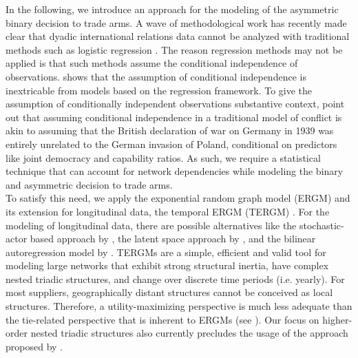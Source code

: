\documentclass[12pt, letterpaper]{article}
\numberwithin{equation}{section}
\begin{document}
In the following, we introduce an approach for the modeling of the asymmetric binary decision to trade arms. 
A wave of methodological work has recently made clear that dyadic international relations data cannot be analyzed with traditional methods such as logistic regression \citep{Ward:2007, WaAhAr:13, art:Thurner2009, art:Cranmer2011}. 
The reason regression methods may not be applied is that such methods assume the conditional independence of observations. 
\cite{art:Cranmer2011} shows that the assumption of conditional independence is inextricable from models based on the regression framework. 
To give the assumption of conditionally independent observations substantive context, \cite{Cranmer2012a} point out that assuming conditional independence in a traditional model of conflict is akin to assuming that the British declaration of war on Germany in 1939 was entirely unrelated to the German invasion of Poland, conditional on predictors like joint democracy and capability ratios. 
As such, we require a statistical technique that can account for network dependencies while modeling the binary and asymmetric decision to trade arms. \\
\indent To satisfy this need, we apply the exponential random graph model (ERGM) and its extension for longitudinal data, the temporal ERGM (TERGM) \citep{HaFuXi:10}. For the modeling of longitudinal data, there are possible alternatives like the stochastic-actor based approach by \cite{Snijders:17}, the latent space approach by \cite{Hoff_etal.2002}, and the bilinear autoregression model by \cite{Minhas_etal.2016}. TERGMs are a simple, efficient and valid tool for modeling large networks that exhibit strong structural inertia, have complex nested triadic structures, and change over discrete time periods (i.e. yearly). For most suppliers, geographically distant structures cannot be conceived as local structures. Therefore, a utility-maximizing perspective is much less adequate than the tie-related perspective that is inherent to ERGMs (see \cite{Block-etal.16}). Our focus on higher-order nested triadic structures also currently precludes the usage of the approach proposed by \cite{Minhas_etal.2016}.\\
\end{document}

